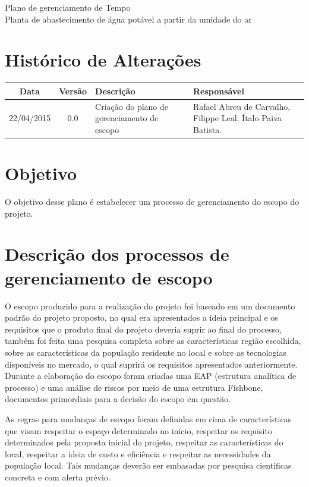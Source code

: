 \documentclass[12pt,openright,oneside,a4paper,brazil]{abntex2}
\title{}
\author{}
\begin{document}
\textual
\begin{center}
 {\large Plano de gerenciamento de Tempo}\\[0.2cm]
 {Planta de abastecimento de água potável a partir da umidade do ar}\\
 \end{center}
 
 \section{Histórico de Alterações}
\begin{table}[h]
\centering
\begin{tabular}{|c|c|p{6cm}|p{5cm}|}

Data & Versão & Descrição & Responsável\\
\hline                               
22/04/2015 & 0.0 & Criação do plano de gerenciamento de escopo & Rafael Abreu de Carvalho, Filippe Leal, Ítalo Paiva Batista. \\
\hline
\end{tabular}
\end{table}

\section{Objetivo}
O objetivo desse plano é estabelecer um processo de gerenciamento do escopo do projeto.

\section{Descrição dos processos de gerenciamento de escopo}
O escopo produzido para a realização do projeto foi baseado em um documento padrão do projeto proposto, no qual era apresentados a ideia principal e os requisitos que o produto final do projeto deveria suprir ao final do processo, também foi feita uma pesquisa completa sobre as características região escolhida, sobre as características da população residente no local e sobre as tecnologias disponíveis no mercado, o qual suprirá os requisitos apresentados anteriormente. Durante a elaboração do escopo foram criadas uma EAP (estrutura analítica de processo) e uma análise de riscos por meio de uma estrutura Fishbone, documentos primordiais para a decisão do escopo em questão.

As regras para mudanças de escopo foram definidas em cima de características que visam respeitar o espaço determinado no inicio, respeitar os requisito determinados pela proposta inicial do projeto, respeitar as características do local, respeitar a ideia de custo e eficiência e respeitar as necessidades da população local. Tais mudanças deverão ser embasadas por pesquisa cientificas concreta e com alerta prévio.
\end{document}
